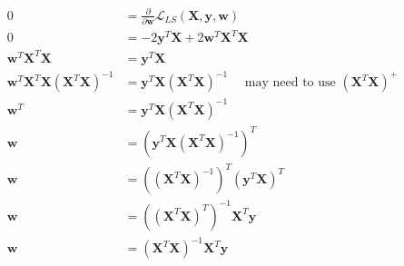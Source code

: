 \newcommand{\matrix}[1]{\mathbf{#1}}
\newcommand{\vector}[1]{\mathbf{#1}}
\newcommand{\X}{\matrix{X}}
\newcommand{\y}{\vector{y}}
\newcommand{\w}{\vector{w}}
\begin{align*}
0 &= \frac{\partial}{\partial \w} \mathcal{L}_{LS}(\X,\y,\w) \\
0 &= -2\y^T\X + 2\w^T\X^T\X \\
\w^T\X^T\X &= \y^T\X \\
\w^T\X^T\X(\X^T\X)^{-1} &= \y^T\X(\X^T\X)^{-1} \quad \text{ may need to use } (\X^T\X)^+ \\
\w^T &= \y^T\X(\X^T\X)^{-1} \\
\w &= (\y^T\X(\X^T\X)^{-1})^T \\
\w &= ((\X^T\X)^{-1})^T (\y^T\X)^T \\
\w &= ((\X^T\X)^T)^{-1} \X^T\y \\
\w &= (\X^T\X)^{-1} \X^T\y \\
\end{align*}
